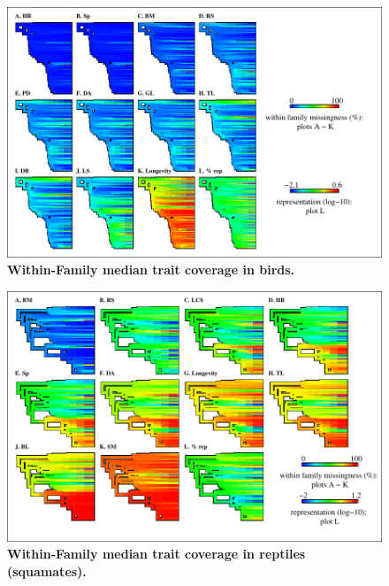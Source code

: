 \begin{figure}[h!]
\centering
\includegraphics[scale=1]{figures/chapter2/NA_phylo_patterns/Birds_coverage}
\caption[Within-Family median trait coverage in birds]{\textbf{Within-Family median trait coverage in birds.}}
\label{familycov_birds}
\end{figure}

\pagebreak

\begin{figure}[h!]
\centering
\includegraphics[scale=1]{figures/chapter2/NA_phylo_patterns/Reptiles_coverage}
\caption[Within-Family median trait coverage in reptiles (squamates)]{\textbf{Within-Family median trait coverage in reptiles (squamates).}}
\label{familycov_reptiles}
\end{figure}

